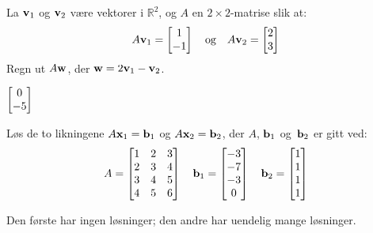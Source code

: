 \begin{oppgave}
La $\mathbf{v}_1$ og $\mathbf{v}_2$ være vektorer i $\mathbb{R}^2$, og $A$ en
$2 \times 2$-matrise slik at:
\[
A\mathbf{v}_1=\begin{bmatrix} 1 \\ -1 \end{bmatrix}
\quad\text{og}\quad
A\mathbf{v}_2=\begin{bmatrix} 2 \\ 3 \end{bmatrix}
\]
Regn ut $A\mathbf{w}$, der $\mathbf{w}=2\mathbf{v}_1-\mathbf{v}_2$.
\end{oppgave}

\begin{losning}
$\begin{bmatrix} 0 \\ -5 \end{bmatrix}$
\end{losning}


\begin{oppgave}
Løs de to likningene
$A\mathbf{x}_1=\mathbf{b}_1$  og $A\mathbf{x}_2=\mathbf{b}_2$,
der $A$, $\mathbf{b}_1$ og~$\mathbf{b}_2$ er gitt ved:
\[
A=\begin{bmatrix}
	1 & 2 & 3\\
	2 & 3 & 4\\
	3 & 4 & 5\\
	4 & 5 & 6
	\end{bmatrix}
\quad
\mathbf{b}_1=
	\begin{bmatrix}
	-3  \\
	-7 \\
	-3 \\
	0
	\end{bmatrix}
\quad
\mathbf{b}_2=
	\begin{bmatrix}
	1  \\
	1 \\
	1 \\
	1
	\end{bmatrix}
\]
\end{oppgave}


\begin{losning}
Den første har ingen løsninger; den andre har uendelig mange løsninger.
\end{losning}



